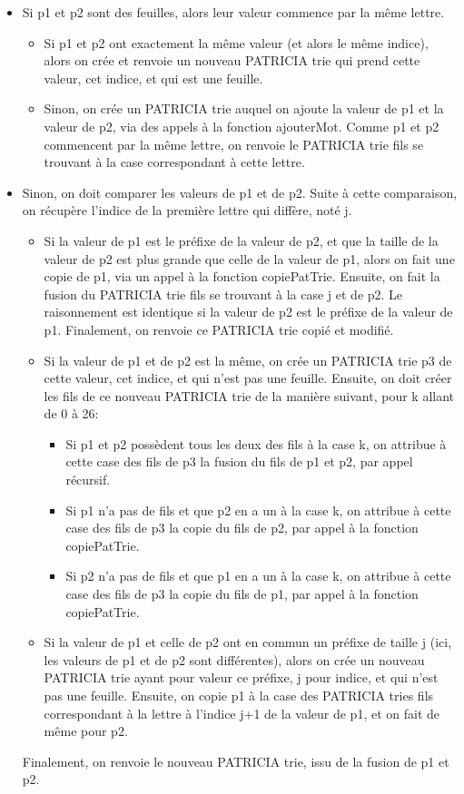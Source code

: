 \documentclass[a4paper,12pt]{report}
\begin{document}
\begin{itemize}
\item Si p1 et p2 sont des feuilles, alors leur valeur commence par la même lettre.
	\begin{itemize}
		\item Si p1 et p2 ont exactement la même valeur (et alors le même indice), alors on crée et renvoie un nouveau PATRICIA trie qui prend cette valeur, cet indice, et qui est une feuille.
		\item Sinon, on crée un PATRICIA trie auquel on ajoute la valeur de p1 et la valeur de p2, via des appels à la fonction ajouterMot. Comme p1 et p2 commencent par la même lettre, on renvoie le PATRICIA trie fils se trouvant à la case correspondant à cette lettre.
	\end{itemize}

\item Sinon, on doit comparer les valeurs de p1 et de p2. Suite à cette comparaison, on récupère l'indice de la première lettre qui diffère, noté j.
	\begin{itemize}
	\item Si la valeur de p1 est le préfixe de la valeur de p2, et que la taille de la valeur de p2 est plus grande que celle de la valeur de p1, alors on fait une copie de p1, via un appel à la fonction copiePatTrie. Ensuite, on fait la fusion du PATRICIA trie fils se trouvant à la case j et de p2. Le raisonnement est identique si la valeur de p2 est le préfixe de la valeur de p1. Finalement, on renvoie ce PATRICIA trie copié et modifié.

	\item Si la valeur de p1 et de p2 est la même, on crée un PATRICIA trie p3 de cette valeur, cet indice, et qui n'est pas une feuille. Ensuite, on doit créer les fils de ce nouveau PATRICIA trie de la manière suivant, pour k allant de 0 à 26: 
	\begin{itemize}
	\item Si p1 et p2 possèdent tous les deux des fils à la case k, on attribue à cette case des fils de p3 la fusion du fils de p1 et p2, par appel récursif.
	\item Si p1 n'a pas de fils et que p2 en a un à la case k, on attribue à cette case des fils de p3 la copie du fils de p2, par appel à la fonction copiePatTrie.
	\item Si p2 n'a pas de fils et que p1 en a un à la case k, on attribue à cette case des fils de p3 la copie du fils de p1, par appel à la fonction copiePatTrie.
	\end{itemize}
	
	\item Si la valeur de p1 et celle de p2 ont en commun un préfixe de taille j (ici, les valeurs de p1 et de p2 sont différentes), alors on crée un nouveau PATRICIA trie ayant pour valeur ce préfixe, j pour indice, et qui n'est pas une feuille. Ensuite, on copie p1 à la case des PATRICIA tries fils correspondant à la lettre à l'indice j+1 de la valeur de p1, et on fait de même pour p2.
	
	\end{itemize}
Finalement, on renvoie le nouveau PATRICIA trie, issu de la fusion de p1 et p2.
\end{itemize}
\end{document}
